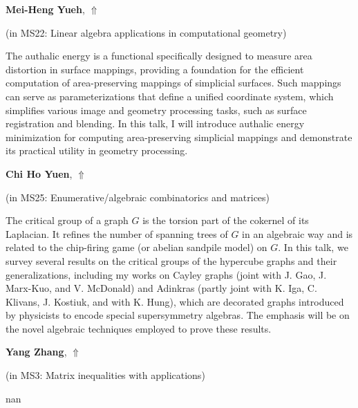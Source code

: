 \documentclass[ILAS2025-program.tex]{subfiles}
\begin{document}
     \hypertarget{down0068}{}\begin{ilasabstract}
    
    \textbf{Mei-Heng Yueh},  \hfill \hyperlink{up0068}{$\Uparrow$}
    
    (in {\color{mstitle}MS22: Linear algebra applications in computational geometry})
        
        \mtskip
    The authalic energy is a functional specifically designed to measure area distortion in surface mappings, providing a foundation for the efficient computation of area-preserving mappings of simplicial surfaces. Such mappings can serve as parameterizations that define a unified coordinate system, which simplifies various image and geometry processing tasks, such as surface registration and blending. In this talk, I will introduce authalic energy minimization for computing area-preserving simplicial mappings and demonstrate its practical utility in geometry processing.
\end{ilasabstract}
     \hypertarget{down0184}{}\begin{ilasabstract}
    
    \textbf{Chi Ho Yuen},  \hfill \hyperlink{up0184}{$\Uparrow$}
    
    (in {\color{mstitle}MS25: Enumerative/algebraic combinatorics and matrices})
        
        \mtskip
    The critical group of a graph $G$ is the torsion part of the cokernel of its Laplacian. It refines the number of spanning trees of $G$ in an algebraic way and is related to the chip-firing game (or abelian sandpile model) on $G$. In this talk, we survey several results on the critical groups of the hypercube graphs and their generalizations, including my works on Cayley graphs (joint with J. Gao, J. Marx-Kuo, and V. McDonald) and Adinkras (partly joint with K. Iga, C. Klivans, J. Kostiuk, and with K. Hung), which are decorated graphs introduced by physicists to encode special supersymmetry algebras. The emphasis will be on the novel algebraic techniques employed to prove these results.\end{ilasabstract}
     \hypertarget{down0146}{}\begin{ilasabstract}
    
    \textbf{Yang Zhang},  \hfill \hyperlink{up0146}{$\Uparrow$}
    
    (in {\color{mstitle}MS3: Matrix inequalities with applications})
        
        \mtskip
    nan\end{ilasabstract}
\end{document}
